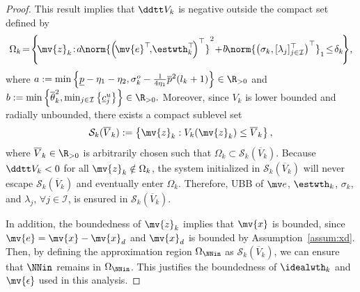 \documentclass[letterpaper, journal, twoside]{IEEEtran}
\begin{document}
\begin{proof}
This result implies that $\ddtt V_{k}$ is negative outside the compact set defined by 
\begin{equation} 
  \Omega_k
  \!
  =
  \!
  \left\{
    \!
    \mv{z}_k
    \!
    :
    \!
    a
    \!
    \norm{
      \left(
        \!
        \mv{e}^\top
        \!
        ,
        \!
        \estwth_k^\top
        \!
      \right)^\top
    }^2
    \!
    +
    \!
    b
    \!
    \norm{
      \left(
        \sigma_k
        ,
        [\lambda_j]_{j\in\mathcal{I}}^\top
      \right)^\top
    }_1
    \!
    \le
    \!
    \delta_k
    \!
  \right\}
  \!
  ,
\end{equation}
where
$
    a
    :=
    \min
    \left\{
        \underline{p}
        - \eta_1
        - \eta_2
        ,
        \sigma_k^o
        -
        \tfrac{1}{4\eta_1}
        \overline{p}^2
        (l_k+1)
    \right\}
    \in\R_{>0}
$ 
and
$
    b
    :=
    \min
    \left\{
        \overline{\theta}_k^2
        ,
        \min_{j\in\mathcal{I}} 
        \left\{
            \underline{c}_j^u
        \right\}
    \right\}
    \in\R_{>0}
    .
$
Moreover, since $V_k$ is lower bounded and radially unbounded, there exists a compact sublevel set
\begin{equation} \label{eq:Sk:def}
  \mathcal S_k(\overline V_k)
  :=
  \left\{ 
    \mv{z}_k 
    : 
    V_k(\mv{z}_k)
    \le 
    \overline{V}_k 
  \right\}
  ,
\end{equation}
where $\overline{V}_k\in\R_{>0}$ is arbitrarily chosen such that $\Omega_k \subset \mathcal{S}_k(\overline{V}_k)$.
Because $\ddtt V_k<0$ for all $\mv{z}_k\notin\Omega_k$, the system initialized in $\mathcal{S}_k(\overline{V}_k)$ will never escape $\mathcal{S}_k(\overline{V}_k)$ and eventually enter $\Omega_k$.
Therefore, UBB of $\mv e$, $\estwth_k$, $\sigma_k$, and $\lambda_j$, $\forall j\in\mathcal I$, is ensured in $\mathcal{S}_k(\overline{V}_k)$.

In addition, the boundedness of $\mv{z}_k$ implies that $\mv{x}$ is bounded, since $\mv{e}=\mv{x}-\mv{x}_d$ and $\mv{x}_d$ is bounded by Assumption~\ref{assum:xd}.
Then, by defining the approximation region $\Omega_{\NNin}$ as $\mathcal{S}_k(\overline{V}_k)$, we can ensure that $\NNin$ remains in $\Omega_{\NNin}$.
This justifies the boundedness of $\idealwth_k$ and $\mv{\epsilon}$ used in this analysis.


\end{proof}
\end{document}
